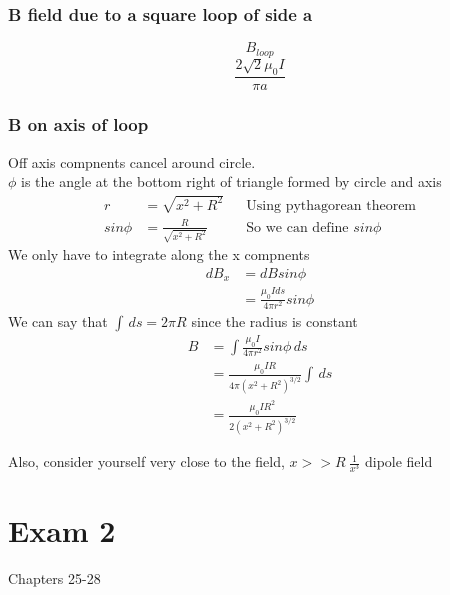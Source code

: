 \documentclass{article}
\begin{document}
    \subsubsection{B field due to a square loop of side a}
    $$B_{loop}$$
    $$\frac{2\sqrt{2}\mu_0 I}{\pi a}$$

    \subsubsection{B on axis of loop}
    Off axis compnents cancel around circle. \\
    $\phi$ is the angle at the bottom right of triangle formed by circle and axis
    \begin{align*}
            r &= \sqrt{x^2 + R^2} && \text{Using pythagorean theorem}\\
            sin\phi &= \frac{R}{\sqrt{x^2 +R^2}} && \text{So we can define }sin\phi
    \end{align*}
    We only have to integrate along the x compnents
    \begin{align*}
            dB_x &=dB sin\phi \\
            &= \frac{\mu_0 I ds}{4\pi r^2}sin\phi
    \end{align*}
    We can say that $\int \,ds = 2\pi R $ since the radius is constant\\
    \begin{align*} 
        B &= \int \frac{\mu_0 I}{4\pi r^2}sin\phi \,ds\\
        &= \frac{\mu_0 I R}{4 \pi (x^2+R^2)^{3/2}}\int \,ds\\
        &= \frac{\mu_0 I R^2}{2 (x^2+R^2)^{3/2}}     
    \end{align*}
    
    Also, consider yourself very close to the field, $ x >> R ~ \frac{1}{x^3}$ dipole field
    \section{Exam 2}
    Chapters 25-28
\end{document}
